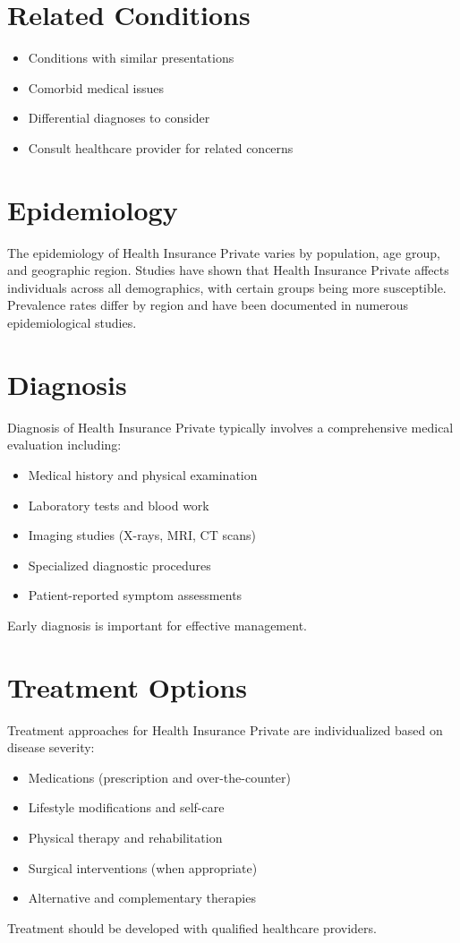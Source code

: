 \section*{Related Conditions}
\begin{itemize}
  \item Conditions with similar presentations
  \item Comorbid medical issues
  \item Differential diagnoses to consider
  \item Consult healthcare provider for related concerns
\end{itemize}

\section*{Epidemiology}
The epidemiology of Health Insurance Private varies by population, age group, and geographic region. Studies have shown that Health Insurance Private affects individuals across all demographics, with certain groups being more susceptible. Prevalence rates differ by region and have been documented in numerous epidemiological studies.

\section*{Diagnosis}
Diagnosis of Health Insurance Private typically involves a comprehensive medical evaluation including:
\begin{itemize}
  \item Medical history and physical examination
  \item Laboratory tests and blood work
  \item Imaging studies (X-rays, MRI, CT scans)
  \item Specialized diagnostic procedures
  \item Patient-reported symptom assessments
\end{itemize}
Early diagnosis is important for effective management.

\section*{Treatment Options}
Treatment approaches for Health Insurance Private are individualized based on disease severity:
\begin{itemize}
  \item Medications (prescription and over-the-counter)
  \item Lifestyle modifications and self-care
  \item Physical therapy and rehabilitation
  \item Surgical interventions (when appropriate)
  \item Alternative and complementary therapies
\end{itemize}
Treatment should be developed with qualified healthcare providers.

